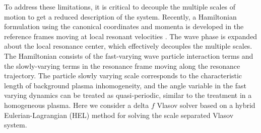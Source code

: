  To address these limitations, %
it is critical
 to decouple the multiple scales of motion to get a reduced description of the system. 
Recently, a Hamiltonian formulation 
 using the canonical coordinates and momenta
is developed in the reference frames moving at local resonant velocities \cite{zheng2023a}.
The wave phase is expanded about the local resonance center, which effectively decouples  the multiple scales.
The Hamiltonian consists of 
the fast-varying wave particle interaction terms
and 
the slowly-varying terms in the resonance frame moving along the resonance trajectory. 
The particle slowly varying scale corresponds to the characteristic length of background plasma inhomogeneity, and the angle variable in the fast varying dynamics %
can be treated as quasi-periodic,
similar to the treatment in a homogeneous plasma.
Here we consider a delta $f$ Vlasov solver based on a hybrid Eulerian-Lagrangian (HEL) method  \cite{shiroto2022} for solving the scale separated Vlasov system.

